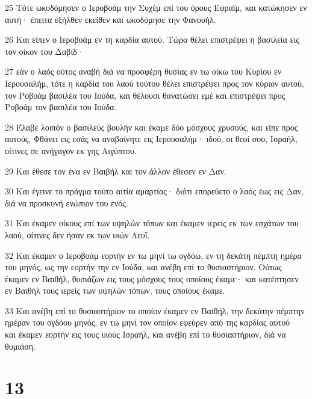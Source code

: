 \par 25 Τότε ωκοδόμησεν ο Ιεροβοάμ την Συχέμ επί του όρους Εφραΐμ, και κατώκησεν εν αυτή· έπειτα εξήλθεν εκείθεν και ωκοδόμησε την Φανουήλ.
\par 26 Και είπεν ο Ιεροβοάμ εν τη καρδία αυτού. Τώρα θέλει επιστρέψει η βασιλεία εις τον οίκον του Δαβίδ·
\par 27 εάν ο λαός ούτος αναβή διά να προσφέρη θυσίας εν τω οίκω του Κυρίου εν Ιερουσαλήμ, τότε η καρδία του λαού τούτου θέλει επιστρέψει προς τον κύριον αυτού, τον Ροβοάμ βασιλέα του Ιούδα, και θέλουσι θανατώσει εμέ και επιστρέψει προς Ροβοάμ τον βασιλέα του Ιούδα.
\par 28 Έλαβε λοιπόν ο βασιλεύς βουλήν και έκαμε δύο μόσχους χρυσούς, και είπε προς αυτούς, Φθάνει εις εσάς να αναβαίνητε εις Ιερουσαλήμ· ιδού, οι θεοί σου, Ισραήλ, οίτινες σε ανήγαγον εκ γης Αιγύπτου.
\par 29 Και έθεσε τον ένα εν Βαιβήλ και τον άλλον έθεσεν εν Δαν.
\par 30 Και έγεινε το πράγμα τούτο αιτία αμαρτίας· διότι επορεύετο ο λαός έως εις Δαν, διά να προσκυνή ενώπιον του ενός.
\par 31 Και έκαμεν οίκους επί των υψηλών τόπων και έκαμεν ιερείς εκ των εσχάτων του λαού, οίτινες δεν ήσαν εκ των υιών Λευΐ.
\par 32 Και έκαμεν ο Ιεροβοάμ εορτήν εν τω μηνί τω ογδόω, εν τη δεκάτη πέμπτη ημέρα του μηνός, ως την εορτήν την εν Ιούδα, και ανέβη επί το θυσιαστήριον. Ούτως έκαμεν εν Βαιθήλ, θυσιάζων εις τους μόσχους τους οποίους έκαμε· και κατέστησεν εν Βαιθήλ τους ιερείς των υψηλών τόπων, τους οποίους έκαμε.
\par 33 Και ανέβη επί το θυσιαστήριον το οποίον έκαμεν εν Βαιθήλ, την δεκάτην πέμπτην ημέραν του ογδόου μηνός, εν τω μηνί τον οποίον εφεύρεν από της καρδίας αυτού· και έκαμεν εορτήν εις τους υιούς Ισραήλ, και ανέβη επί το θυσιαστήριον, διά να θυμιάση.

\chapter{13}

